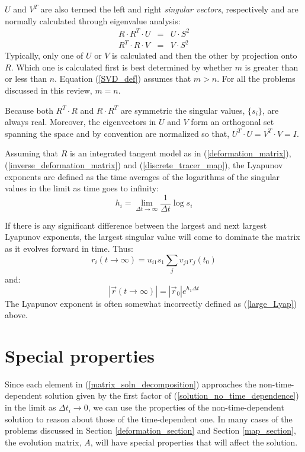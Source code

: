 \documentclass[11pt]{article}
\begin{document}
$U$ and $V^T$ are also termed the left and right {\it singular vectors}, 
respectively and are normally calculated through eigenvalue analysis:
\begin{eqnarray}
	R\cdot R^T \cdot U & = & U \cdot S^2 \label{left_SV_eigenproblem}\\
	R^T \cdot R \cdot V & = & V \cdot S^2 \label{right_SV_eigenproblem}
\end{eqnarray}
Typically, only one of $U$ or $V$ is calculated and then the other by projection
onto $R$.  Which one is calculated first is best determined by whether $m$
is greater than or less than $n$.  Equation (\ref{SVD_def}) assumes that 
$m>n$. 
For all the problems discussed in this review, $m=n$.

Because both $R^T \cdot R$ and $R \cdot R^T$ are symmetric
the singular values,
$\lbrace s_i \rbrace$, are always real.
Moreover, the eigenvectors in $U$ and $V$ form an orthogonal set spanning the
space and by convention are normalized so that,
$U^T \cdot U = V^T \cdot V = I$.

Assuming that $R$ is an integrated tangent model as in 
(\ref{deformation_matrix}), (\ref{inverse_deformation_matrix})
and (\ref{discrete_tracer_map}), 
the Lyapunov exponents are defined as the time averages of the logarithms
of the singular values in the limit as time goes to infinity:
\begin{equation}
h_i=\lim_{\Delta t \rightarrow \infty} \frac{1}{\Delta t} \log s_i
\label{Lyap_def}
\end{equation}

If there is any significant difference between the largest and next largest
Lyapunov exponents, the largest singular value will come to dominate the matrix
as it evolves forward in time.  Thus:
\begin{equation}
r_i(t \rightarrow \infty) = u_{i1} s_1 \sum_j v_{j1} r_j(t_0)
\end{equation}
and:
\begin{equation}
|\vec r(t \rightarrow \infty)| = |\vec r_0| e^{h_1 \Delta t}
\label{large_Lyap}
\end{equation}
The Lyapunov exponent is often somewhat incorrectly defined as
(\ref{large_Lyap}) above.

\section{Special properties}

Since each element in (\ref{matrix_soln_decomposition}) approaches the
non-time-dependent solution given by the first factor of 
(\ref{solution_no_time_dependence}) in the limit as $\Delta t_i\rightarrow 0$, 
we can use the properties of the non-time-dependent solution to
reason about those of the time-dependent one.
In many cases of the problems discussed in Section \ref{deformation_section}
and Section \ref{map_section}, the evolution matrix, $A$, will have
special properties that will affect the solution.
\end{document}

